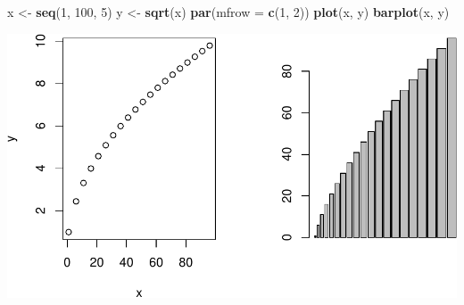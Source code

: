 \documentclass[
]{article}
\newenvironment{Shaded}{\begin{snugshade}}{\end{snugshade}}
\newcommand{\AttributeTok}[1]{\textcolor[rgb]{0.13,0.29,0.53}{#1}}
\newcommand{\DecValTok}[1]{\textcolor[rgb]{0.00,0.00,0.81}{#1}}
\newcommand{\FunctionTok}[1]{\textcolor[rgb]{0.13,0.29,0.53}{\textbf{#1}}}
\newcommand{\NormalTok}[1]{#1}
\newcommand{\OtherTok}[1]{\textcolor[rgb]{0.56,0.35,0.01}{#1}}
\begin{document}
\begin{Shaded}
\begin{Highlighting}[]
\NormalTok{x }\OtherTok{\textless{}{-}} \FunctionTok{seq}\NormalTok{(}\DecValTok{1}\NormalTok{, }\DecValTok{100}\NormalTok{, }\DecValTok{5}\NormalTok{)}
\NormalTok{y }\OtherTok{\textless{}{-}} \FunctionTok{sqrt}\NormalTok{(x)}
\FunctionTok{par}\NormalTok{(}\AttributeTok{mfrow =} \FunctionTok{c}\NormalTok{(}\DecValTok{1}\NormalTok{, }\DecValTok{2}\NormalTok{))}
\FunctionTok{plot}\NormalTok{(x, y)}
\FunctionTok{barplot}\NormalTok{(x, y)}
\end{Highlighting}
\end{Shaded}

\includegraphics{es2_files/figure-latex/unnamed-chunk-6-1.pdf}
\end{document}
